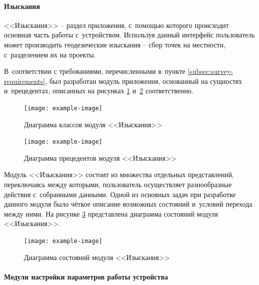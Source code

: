 \paragraph{Изыскания}

<<Изыскания>> -- раздел приложения, с~помощью которого происходит основная часть работы с~устройством. Используя данный интерфейс пользователь может производить геодезические изыскания -- сбор точек на местности, с~разделением их на проекты.

В~соответствии с требованиями, перечисленными в~пункте \ref{subsec:survey-requirements}, был разработан модуль приложения, основанный на сущностях и~прецедентах, описанных на рисунках \ref{fig:survey-uml-classes} и~\ref{fig:survey-uml-usecase} соответственно.

\begin{figure}[h!]
  \centering
  \setlength{\fboxsep}{5pt}
  \texttt{[image: example-image]}
  \vspace*{6pt}
  \caption{Диаграмма классов модуля <<Изыскания>>}
  \label{fig:survey-uml-classes}
\end{figure}

\begin{figure}[h!]
  \centering
  \setlength{\fboxsep}{5pt}
  \texttt{[image: example-image]}
  \vspace*{6pt}
  \caption{Диаграмма прецедентов модуля <<Изыскания>>}
  \label{fig:survey-uml-usecase}
\end{figure}

Модуль <<Изыскания>> состоит из множества отдельных представлений, переключаясь между которыми, пользователь осуществляет разнообразные действия с~собранными данными. Одной из основных задач при разработке данного модуля было чёткое описание возможных состояний и~условий перехода между ними. На рисунке \ref{fig:survey-uml-state} представлена диаграмма состояний модуля <<Изыскания>>.

\begin{figure}[h!]
  \centering
  \setlength{\fboxsep}{5pt}
  \texttt{[image: example-image]}
  \vspace*{6pt}
  \caption{Диаграмма состояний модуля <<Изыскания>>}
  \label{fig:survey-uml-state}
\end{figure}

\paragraph{Модули настройки параметров работы устройства}

